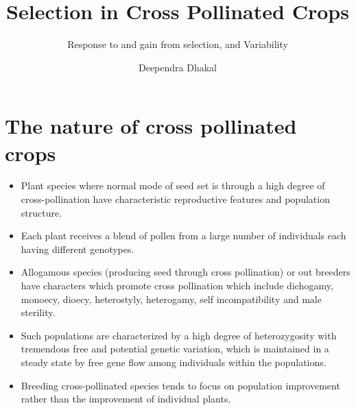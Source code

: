 \documentclass[11pt,ignorenonframetext,aspectratio=169]{beamer}
\title[]{Selection in Cross Pollinated Crops}
\subtitle{Response to and gain from selection, and Variability}
\author[
        Deependra Dhakal
    ]{Deependra Dhakal}
\institute[
    ]{
    Agriculture and Forestry University\\
\textit{ddhakal.rookie@gmail.com}\\
\url{https://rookie.rbind.io}
    }
\date[
      
  ]{
    }
\providecommand{\tightlist}{%
  \setlength{\itemsep}{0pt}\setlength{\parskip}{0pt}}
\begin{document}
  \begin{frame}[plain]
  \titlepage
  \end{frame}



\hypertarget{the-nature-of-cross-pollinated-crops}{%
\section{The nature of cross pollinated
crops}\label{the-nature-of-cross-pollinated-crops}}

\begin{frame}{}
\protect\hypertarget{section}{}
\begin{itemize}
\tightlist
\item
  Plant species where normal mode of seed set is through a high degree
  of cross-pollination have characteristic reproductive features and
  population structure.
\item
  Each plant receives a blend of pollen from a large number of
  individuals each having different genotypes.
\item
  Allogamous species (producing seed through cross pollination) or out
  breeders have characters which promote cross pollination which include
  dichogamy, monoecy, dioecy, heterostyly, heterogamy, self
  incompatibility and male sterility.
\item
  Such populations are characterized by a
  \alert{high degree of heterozygosity} with tremendous
  \alert{free and potential genetic variation}, which is maintained in a
  steady state by free gene flow among individuals within the
  populations.
\item
  Breeding cross-pollinated species tends to focus on
  \alert{population improvement} rather than the improvement of
  individual plants.
\end{itemize}
\end{frame}
\end{document}
